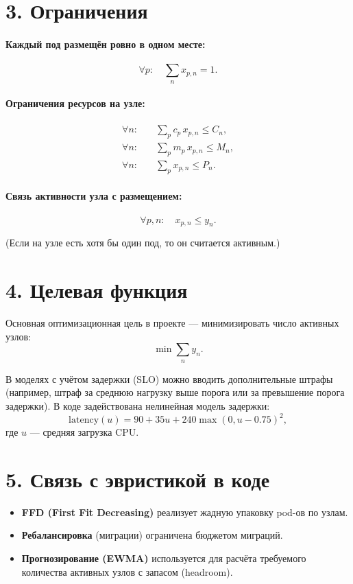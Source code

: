 \documentclass[11pt]{article}
\begin{document}
\section*{3. Ограничения}

\paragraph{Каждый под размещён ровно в одном месте:}
\[
  \forall p:\quad \sum_n x_{p,n} = 1.
\]

\paragraph{Ограничения ресурсов на узле:}
\begin{align*}
  \forall n:\quad &\sum_p c_p\,x_{p,n} \le C_n, \\
  \forall n:\quad &\sum_p m_p\,x_{p,n} \le M_n, \\
  \forall n:\quad &\sum_p x_{p,n} \le P_n.
\end{align*}

\paragraph{Связь активности узла с размещением:}
\[
  \forall p,n:\quad x_{p,n} \le y_n.
\]

(Если на узле есть хотя бы один под, то он считается активным.)

\section*{4. Целевая функция}

Основная оптимизационная цель в проекте --- минимизировать число активных узлов:
\[
  \min \sum_n y_n.
\]

В моделях с учётом задержки (SLO) можно вводить дополнительные штрафы
(например, штраф за среднюю нагрузку выше порога или за превышение порога задержки).
В коде задействована нелинейная модель задержки:
\[
  \text{latency}(u) = 90 + 35u + 240\max(0, u - 0.75)^2,
\]
где \(u\) --- средняя загрузка CPU.

\section*{5. Связь с эвристикой в коде}

\begin{itemize}
  \item \textbf{FFD (First Fit Decreasing)} реализует жадную упаковку pod-ов по узлам.
  \item \textbf{Ребалансировка} (миграции) ограничена бюджетом миграций.
  \item \textbf{Прогнозирование (EWMA)} используется для расчёта требуемого количества активных узлов с запасом (headroom).
\end{itemize}
\end{document}
